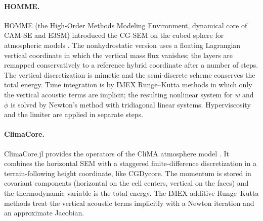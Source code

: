 \documentclass[11pt,a4paper]{article}
\begin{document}
\paragraph{HOMME.}
HOMME (the High-Order Methods Modeling Environment, dynamical core of CAM-SE
and E3SM) introduced the CG-SEM on the cubed sphere for atmospheric models
\cite{TaylorFournier2010,Dennis2012}. The nonhydrostatic version
\cite{Taylor2020} uses a floating Lagrangian vertical coordinate in which the
vertical mass flux vanishes; the layers are remapped conservatively to a
reference hybrid coordinate after a number of steps. The vertical
discretization is mimetic and the semi-discrete scheme conserves the total
energy. Time integration is by IMEX Runge--Kutta methods \cite{Steyer2019}
in which only the vertical acoustic terms are implicit; the resulting
nonlinear system for $w$ and $\phi$ is solved by Newton's method with
tridiagonal linear systems. Hyperviscosity and the limiter
\cite{Guba2014a,Guba2014b} are applied in separate steps.

\paragraph{ClimaCore.}
ClimaCore.jl provides the operators of the CliMA atmosphere model
\cite{Yatunin2025}. It combines the horizontal SEM with a staggered
finite-difference discretization in a terrain-following height coordinate,
like CGDycore. The momentum is stored in covariant components (horizontal
on the cell centers, vertical on the faces) and the thermodynamic variable
is the total energy. The IMEX additive Runge--Kutta methods treat the vertical
acoustic terms implicitly with a Newton iteration and an approximate Jacobian.
\end{document}
